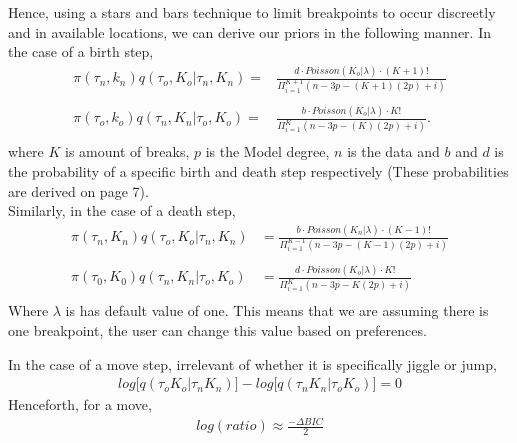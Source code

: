 \documentclass[submit]{smj}
\begin{document}
Hence, using a stars and bars technique to limit breakpoints to occur discreetly and in available locations, we can derive our priors in the following manner. In the case of a birth step, 
\begin{align*}
\pi (\tau_{n} , k_{n}) q(\tau_{o}, K_{o} | \tau_{n}, K_{n}) =& \frac{d \cdot Poisson(K_{o} | \lambda) \cdot (K+1)!}{ \Pi_{i=1}^{K+1} (n-3p-(K+1)(2p) +i) } \\ \\
\pi(\tau_o, k_o)q(\tau_{n}, K_{n} | \tau_{o}, K_{o}) =& \frac{b \cdot Poisson(K_{o} | \lambda) \cdot K!}{\Pi_{i=1}^K (n-3p-(K)(2p) +i)}.\\
\end{align*}
where $K$ is amount of breaks, $p$ is the Model degree, $n$ is the data and $b$ and $d$ is the probability of a specific birth and death step respectively (These probabilities are derived on page 7).\\
Similarly, in the case of a death step,  
\begin{align*}
\pi(\tau_{n}, K_{n})q(\tau_{o}, K_{o} | \tau_{n}, K_{n}) &= \frac{b \cdot Poisson(K_{n} | \lambda) \cdot (K-1)!}{ \Pi_{i=1}^{K-1} (n-3p-(K-1)(2p)+i)} \\ \\
\pi(\tau_0, K_0)q(\tau_{n}, K_{n} | \tau_{o}, K_{o}) &= \frac{ d \cdot Poisson(K_{o} | \lambda) \cdot K! }{\Pi_{i=1}^K (n-3p-K(2p)+i) }\\ 
\end{align*} 
Where $\lambda$ is has default value of one. This means that we are assuming there is one breakpoint, the user can change this value based on preferences.  

In the case of a move step, irrelevant of whether it is specifically jiggle or jump, 
\begin{align*} 
log \big[ q(\tau_{o} K_{o} | \tau_{n} K_{n}) \big] - log \big[ q(\tau_{n} K_{n}| \tau_{o} K_{o})  \big] = 0 
\end{align*}
Henceforth, for a move, 
\begin{align*}
log(ratio) \approx \frac{- \Delta BIC}{2} 
\end{align*}
\end{document}
